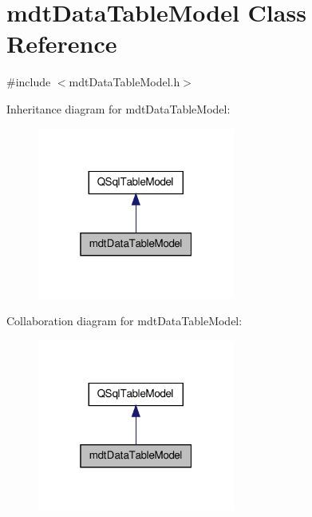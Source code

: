 \hypertarget{classmdt_data_table_model}{\section{mdt\-Data\-Table\-Model Class Reference}
\label{classmdt_data_table_model}
}


{\ttfamily \#include $<$mdt\-Data\-Table\-Model.\-h$>$}



Inheritance diagram for mdt\-Data\-Table\-Model\-:
\nopagebreak
\begin{figure}[H]
\begin{center}
\leavevmode
\includegraphics[width=184pt]{classmdt_data_table_model__inherit__graph}
\end{center}
\end{figure}


Collaboration diagram for mdt\-Data\-Table\-Model\-:
\nopagebreak
\begin{figure}[H]
\begin{center}
\leavevmode
\includegraphics[width=184pt]{classmdt_data_table_model__coll__graph}
\end{center}
\end{figure}
